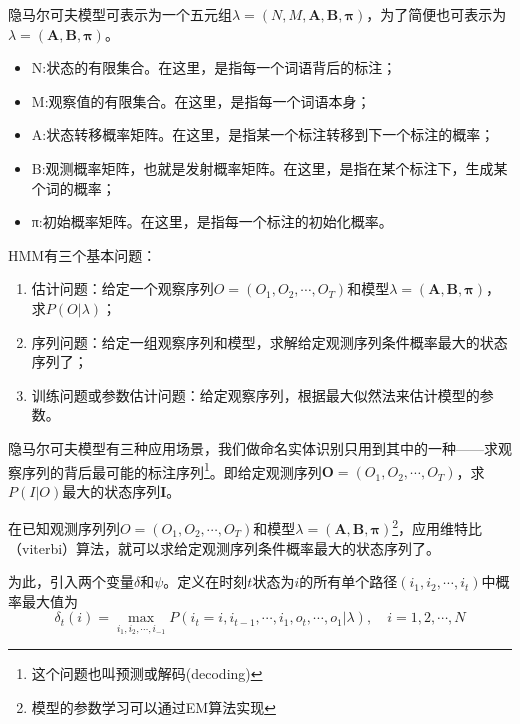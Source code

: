 \documentclass[a4paper,UTF8,no-math]{ctexart}
\begin{document}
	
	
	隐马尔可夫模型可表示为一个五元组$\lambda=(N,M,\mathbf{A}, \mathbf{B}, \mathbf{\pi})$，为了简便也可表示为$\lambda=(\mathbf{A}, \mathbf{B}, \mathbf{\pi})$。
	
	
	
	\begin{itemize}
		\item N:状态的有限集合。在这里，是指每一个词语背后的标注；
		\item M:观察值的有限集合。在这里，是指每一个词语本身；
		\item A:状态转移概率矩阵。在这里，是指某一个标注转移到下一个标注的概率；
		\item B:观测概率矩阵，也就是发射概率矩阵。在这里，是指在某个标注下，生成某个词的概率；
		\item π:初始概率矩阵。在这里，是指每一个标注的初始化概率。
	\end{itemize}
	
	HMM有三个基本问题：
	
	\begin{enumerate}
		\item 估计问题：给定一个观察序列$O = (O_{1},O_{2}, \cdots ,O_{T})$和模型$\lambda=(\mathbf{A}, \mathbf{B},\mathbf{\pi})$，求$P(O | \lambda)$；
		\item 序列问题：给定一组观察序列和模型，求解给定观测序列条件概率最大的状态序列了；
		\item 训练问题或参数估计问题：给定观察序列，根据最大似然法来估计模型的参数。
	\end{enumerate}
	
	隐马尔可夫模型有三种应用场景，我们做命名实体识别只用到其中的一种——求观察序列的背后最可能的标注序列\footnote{这个问题也叫预测或解码(decoding)}。即给定观测序列$\mathbf{O} = (O_{1},O_{2}, \cdots ,O_{T})$，求$P(I|O)$最大的状态序列$\mathbf{I}$。
	
	在已知观测序列列$O = (O_{1},O_{2}, \cdots ,O_{T})$和模型$\lambda=(\mathbf{A}, \mathbf{B},\mathbf{\pi})$\footnote{模型的参数学习可以通过EM算法实现}，应用维特比（viterbi）算法，就可以求给定观测序列条件概率最大的状态序列了。
	
	为此，引入两个变量$\delta$和$\psi$。定义在时刻$t$状态为$i$的所有单个路径$\left(i_{1}, i_{2}, \cdots, i_{t}\right)$中概率最大值为$$\delta_{t}(i)=\max _{i_{1}, i_{2}, \cdots, i_{-1}} P\left(i_{t}=i, i_{t-1}, \cdots, i_{1}, o_{t}, \cdots, o_{1} | \lambda\right), \quad i=1,2, \cdots, N$$
	
\end{document}
